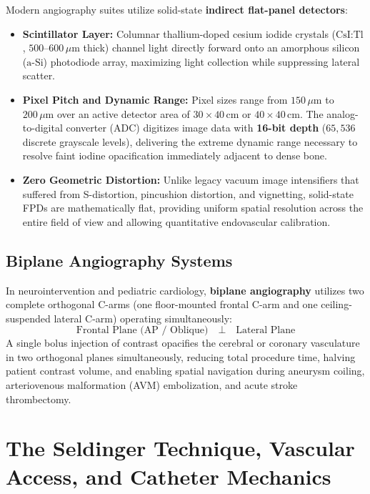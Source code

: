 \documentclass[11pt,a4paper]{article}
\begin{document}
Modern angiography suites utilize solid-state \textbf{indirect flat-panel detectors}:
\begin{itemize}[leftmargin=*]
    \item \textbf{Scintillator Layer:} Columnar thallium-doped cesium iodide crystals ($\text{CsI:Tl}$, $500\text{--}600\,\mu\text{m}$ thick) channel light directly forward onto an amorphous silicon ($\text{a-Si}$) photodiode array, maximizing light collection while suppressing lateral scatter.
    \item \textbf{Pixel Pitch and Dynamic Range:} Pixel sizes range from $150\,\mu\text{m}$ to $200\,\mu\text{m}$ over an active detector area of $30 \times 40\,\text{cm}$ or $40 \times 40\,\text{cm}$. The analog-to-digital converter (ADC) digitizes image data with \textbf{16-bit depth} ($65{,}536$ discrete grayscale levels), delivering the extreme dynamic range necessary to resolve faint iodine opacification immediately adjacent to dense bone.
    \item \textbf{Zero Geometric Distortion:} Unlike legacy vacuum image intensifiers that suffered from S-distortion, pincushion distortion, and vignetting, solid-state FPDs are mathematically flat, providing uniform spatial resolution across the entire field of view and allowing quantitative endovascular calibration.
\end{itemize}

\subsection{Biplane Angiography Systems}

In neurointervention and pediatric cardiology, \textbf{biplane angiography} utilizes two complete orthogonal C-arms (one floor-mounted frontal C-arm and one ceiling-suspended lateral C-arm) operating simultaneously:
\begin{equation}
    \text{Frontal Plane (AP / Oblique)} \quad \perp \quad \text{Lateral Plane}
\end{equation}
A single bolus injection of contrast opacifies the cerebral or coronary vasculature in two orthogonal planes simultaneously, reducing total procedure time, halving patient contrast volume, and enabling spatial navigation during aneurysm coiling, arteriovenous malformation (AVM) embolization, and acute stroke thrombectomy.

\newpage
\section{The Seldinger Technique, Vascular Access, and Catheter Mechanics}
\end{document}
